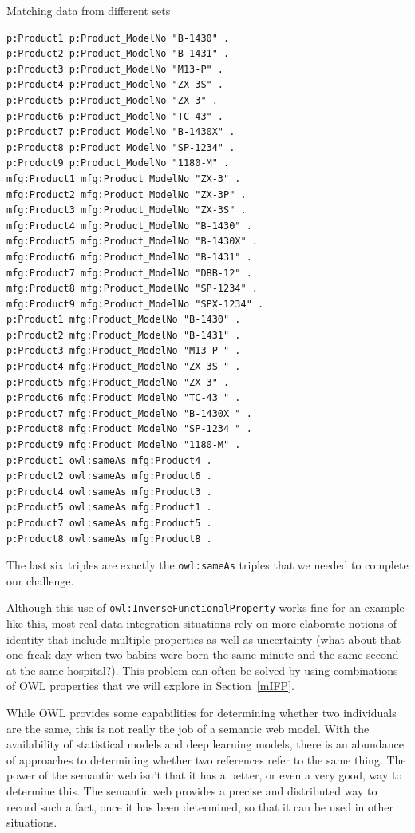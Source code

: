 \begin{challenge}{Matching data from different sets}
\begin{lstlisting}
p:Product1 p:Product_ModelNo "B-1430" .
p:Product2 p:Product_ModelNo "B-1431" .
p:Product3 p:Product_ModelNo "M13-P" .
p:Product4 p:Product_ModelNo "ZX-3S" .
p:Product5 p:Product_ModelNo "ZX-3" .
p:Product6 p:Product_ModelNo "TC-43" .
p:Product7 p:Product_ModelNo "B-1430X" .
p:Product8 p:Product_ModelNo "SP-1234" .
p:Product9 p:Product_ModelNo "1180-M" .
mfg:Product1 mfg:Product_ModelNo "ZX-3" .
mfg:Product2 mfg:Product_ModelNo "ZX-3P" .
mfg:Product3 mfg:Product_ModelNo "ZX-3S" .
mfg:Product4 mfg:Product_ModelNo "B-1430" .
mfg:Product5 mfg:Product_ModelNo "B-1430X" .
mfg:Product6 mfg:Product_ModelNo "B-1431" .
mfg:Product7 mfg:Product_ModelNo "DBB-12" .
mfg:Product8 mfg:Product_ModelNo "SP-1234" .
mfg:Product9 mfg:Product_ModelNo "SPX-1234" .
p:Product1 mfg:Product_ModelNo "B-1430" .
p:Product2 mfg:Product_ModelNo "B-1431" .
p:Product3 mfg:Product_ModelNo "M13-P " .
p:Product4 mfg:Product_ModelNo "ZX-3S " .
p:Product5 mfg:Product_ModelNo "ZX-3" .
p:Product6 mfg:Product_ModelNo "TC-43 " .
p:Product7 mfg:Product_ModelNo "B-1430X " .
p:Product8 mfg:Product_ModelNo "SP-1234 " .
p:Product9 mfg:Product_ModelNo "1180-M" .
p:Product1 owl:sameAs mfg:Product4 .
p:Product2 owl:sameAs mfg:Product6 .
p:Product4 owl:sameAs mfg:Product3 .
p:Product5 owl:sameAs mfg:Product1 .
p:Product7 owl:sameAs mfg:Product5 .
p:Product8 owl:sameAs mfg:Product8 .
\end{lstlisting}  

The last six triples are exactly the \texttt{owl:sameAs} triples that we needed
to complete our challenge.

\end{challenge}

Although this use of \texttt{owl:InverseFunctionalProperty} works fine for an
example like this, most real data integration situations rely on more
elaborate notions of identity that include multiple properties as well
as uncertainty (what about that one freak day when two babies were born
the same minute and the same second at the same hospital?). This problem
can often be solved by using combinations of OWL properties that we will
explore in Section~\ref{mIFP}.  

While OWL provides some capabilities for determining whether two individuals are 
the same, this is not really the job of a semantic web model.  With the 
availability of statistical models and deep learning models, there is an 
abundance of approaches to determining whether two references refer to the
same thing.  The power of the semantic web isn't that it has a better, or even 
a very good, way to determine this.  The semantic web provides a precise and 
distributed way to record such a fact, once it has been determined, so that it 
can be used in other situations. 

